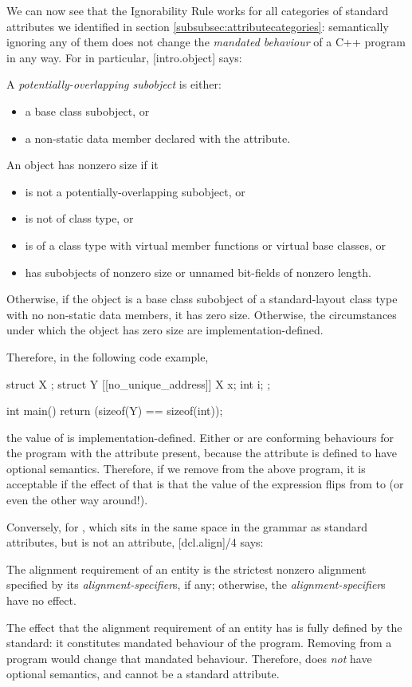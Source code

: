 We can now see that the Ignorability Rule works for all categories of standard attributes we identified in section \ref{subsubsec:attributecategories}: semantically ignoring any of them does not change the \emph{mandated behaviour} of a C++ program in any way. For  in particular, [intro.object] says:
\begin{adjustwidth}{0.5cm}{0.5cm}
A \emph{potentially-overlapping subobject} is either:
\begin{itemize}
\item a base class subobject, or
\item a non-static data member declared with the  attribute.
\end{itemize}
An object has nonzero size if it
\begin{itemize}
\item is not a potentially-overlapping subobject, or
\item is not of class type, or
\item is of a class type with virtual member functions or virtual base classes, or
\item has subobjects of nonzero size or unnamed bit-fields of nonzero length.
\end{itemize}
Otherwise, if the object is a base class subobject of a standard-layout class type with no non-static data members, it has zero size. Otherwise, the circumstances under which the object has zero size are implementation-defined. 
\end{adjustwidth}

Therefore, in the following code example,
\begin{codeblock}
struct X {};
struct Y {
  [[no_unique_address]] X x;
  int i; 
};

int main() { 
  return (sizeof(Y) == sizeof(int)); 
}
\end{codeblock}

the value of  is implementation-defined. Either  or  are conforming behaviours for the program with the  attribute present, because the attribute is defined to have optional semantics. Therefore, if we remove  from the above program, it is acceptable if the effect of that is that the value of the expression flips from  to  (or even the other way around!).

Conversely, for , which sits in the same space in the grammar as standard attributes, but is not an attribute, [dcl.align]/4 says:
\begin{adjustwidth}{0.5cm}{0.5cm}
The alignment requirement of an entity is the strictest nonzero alignment specified by its \emph{alignment-specifier}s, if any; otherwise, the \emph{alignment-specifier}s have no effect.
\end{adjustwidth}
The effect that the alignment requirement of an entity has is fully defined by the standard: it constitutes mandated behaviour of the program. Removing  from a program would change that mandated behaviour. Therefore,  does \emph{not} have optional semantics, and cannot be a standard attribute.

